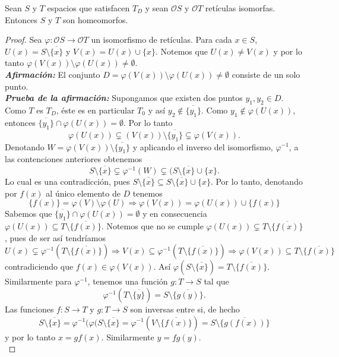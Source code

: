 \begin{thm}
    Sean $S$ y $T$ espacios que satisfacen $T_D$ y sean $\mathcal{O}S$ y $\mathcal{O}T$ retículas isomorfas. Entonces $S$ y $T$ son homeomorfos.  
\end{thm}

\begin{proof}
    Sea $\varphi\colon \mathcal{O}S\to \mathcal{O}T$ un isomorfismo de retículas. Para cada $x\in S$, $U(x)=S\setminus \overline{\{x\}}$ y $V(x)=U(x)\cup \{x\}$. Notemos que $U(x)\neq V(x)$ y por lo tanto $\varphi(V(x))\setminus \varphi(U(x))\neq\emptyset$.\\

    \noindent
    \emph{\textbf{Afirmación:}} El conjunto $D=\varphi(V(x))\setminus \varphi(U(x))\neq\emptyset$ consiste de un solo punto.\\

    \noindent
    \emph{\textbf{Prueba de la afirmación:}} Supongamos que existen dos puntos $y_1, y_2\in D$. Como $T$ es $T_D$, éste es en particular $T_0$ y así $y_2\notin \overline{\{y_1\}}$. Como $y_1\notin \varphi(U(x))$, entonces $\overline{\{y_1\}}\cap \varphi(U(x))=\emptyset$. Por lo tanto 
    \[
    \varphi(U(x))\varsubsetneq (V(x))\setminus\overline{\{y_1\}}\varsubsetneq \varphi(V(x)).
    \]
    Denotando $W=\varphi(V(x))\setminus\overline{\{y_1\}}$ y aplicando el inverso del isomorfismo, $\varphi^{-1}$, a las contenciones anteriores obtenemos
    \[
    S\setminus\overline{\{x\}}\varsubsetneq \varphi^{-1}(W)\varsubsetneq (S\setminus\overline{\{x\}}\cup\{x\}.
    \]
    Lo cual es una contradicción, pues $S\setminus\overline{\{x\}}\subseteq S\setminus\overline{\{x\}}\cup\{x\}$. Por lo tanto, denotando por $f(x)$ al único elemento de $D$ tenemos 
    \[
    \{f(x)\}=\varphi(V)\setminus\varphi(U)\Rightarrow \varphi(V(x))=\varphi(U(x))\cup\{f(x)\}
    \]
    Sabemos que $\overline{\{y_1\}}\cap \varphi(U(x))=\emptyset$ y en consecuencia $\varphi(U(x))\subseteq T\setminus \overline{\{f(x)\}}$. Notemos que no se cumple $\varphi(U(x))\varsubsetneq T\setminus \overline{\{f(x)\}}$, pues de ser así tendríamos 
    \[
    U(x)\varsubsetneq \varphi^{-1}(T\setminus\overline{\{f(x)\}})\Rightarrow V(x)\subseteq \varphi^{-1}(T\setminus\overline{\{f(x)\}})\Rightarrow \varphi(V(x))\subseteq T\setminus\overline{\{f(x)\}}
    \]
    contradiciendo que $f(x)\in \varphi(V(x))$. Así $\varphi(S\setminus \overline{\{x\}})=T\setminus\overline{\{f(x)\}}$.\\

    \noindent
    Similarmente para $\varphi^{-1}$, tenemos una función $g\colon T\to S$ tal que 
    \[
    \varphi^{-1}(T\setminus\overline{\{y\}})=S\setminus\overline{\{g(y)\}}.
    \]
    Las funciones $f\colon S\to T$ y $g\colon T\to S$ son inversas entre si, de hecho 
    \[
    S\setminus\overline{\{x\}}=\varphi^{-1}(\varphi(S\setminus\overline{\{x\}}=\varphi^{-1}(V\setminus\overline{\{f(x)\}})=S\setminus\overline{\{g(f(x))\}}
    \]
    y por lo tanto $x=gf(x)$. Similarmente $y=fg(y)$.\\  


\end{proof}
